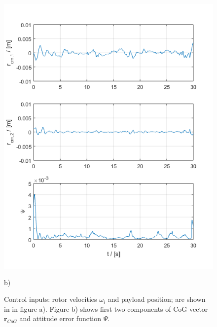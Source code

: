 \begin{figure}[h!]
\begin{minipage}{0.5\columnwidth}
		\includegraphics[width=\columnwidth]{./pictures/manip_traj_rcmPsi.png}
		\caption*{b)}
		\label{fig:manip_rcm}
	\end{minipage}
	\caption{Control inputs: rotor velocities $\omega_i$ and payload position; are shown in in figure a). Figure b) shows first two components of CoG vector $\textbf{r}_{CoG}$ and attitude error function $\Psi$.}
\end{figure}
